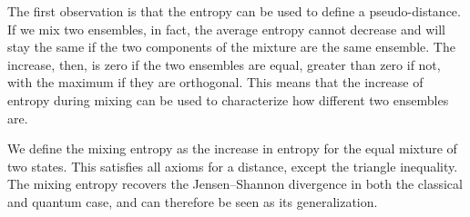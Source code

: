 The first observation is that the entropy can be used to define a pseudo-distance. If we mix two ensembles, in fact, the average entropy cannot decrease and will stay the same if the two components of the mixture are the same ensemble. The increase, then, is zero if the two ensembles are equal, greater than zero if not, with the maximum if they are orthogonal. This means that the increase of entropy during mixing can be used to characterize how different two ensembles are.

We define the mixing entropy as the increase in entropy for the equal mixture of two states. This satisfies all axioms for a distance, except the triangle inequality. The mixing entropy recovers the Jensen--Shannon divergence in both the classical and quantum case, and can therefore be seen as its generalization.

